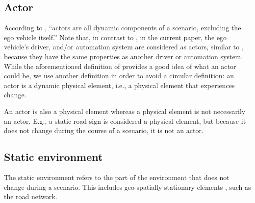 \subsection{Actor}
\label{sec:actor}

According to \textcite{catapult2018musicc}, ``actors are all dynamic components of a scenario, excluding the ego vehicle itself.'' 
Note that, in contrast to \autocite{catapult2018musicc}, in the current paper, the ego vehicle's driver, and/or automation system are considered as actors, similar to \autocite{geyer2014},  because they have the same properties as another driver or automation system.
\cstarte While the aforementioned definition of \textcite{catapult2018musicc} provides a good idea of what an actor could be, we use another definition in order to avoid a circular definition: an actor is a dynamic physical element, i.e., a physical element that experiences change. \cende

\cstartc
\begin{remark}
	An actor is also a physical element whereas a physical element is not necessarily an actor.
	\cstartf E.g., a static road sign is considered a physical element, but because it does not change during the course of a scenario, it is not an actor. \cendf
\end{remark}
\cendc



\subsection{Static environment}
\label{sec:static environment}

The static environment refers to the part of the environment that does not change during a scenario. This includes geo-spatially stationary elements \autocite{ulbrich2015},  such as the road network.



